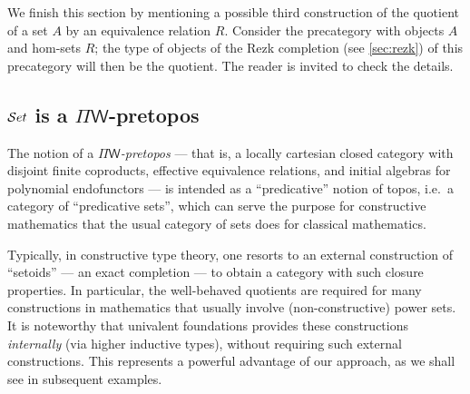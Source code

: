We finish this section by mentioning a possible third construction of the quotient of a set $A$ by an equivalence relation $R$.
Consider the precategory with objects $A$ and hom-sets $R$; the type of objects of the Rezk completion
%
(see \autoref{sec:rezk}) of this precategory will then be the
quotient. The reader is invited to check the details.

%
%
%

\subsection{\texorpdfstring{$\mathcal{S}et$}{Set} is a \texorpdfstring{$\Pi\mathsf{W}$}{ΠW}-pretopos}
\label{subsec:piw}

%

The notion of a \emph{$\Pi\mathsf{W}$-pretopos}
%
--- that is, a locally cartesian closed category
%
%
with disjoint finite coproducts, effective equivalence relations, and initial algebras for polynomial endofunctors --- is intended as a ``predicative''
%
notion of topos, i.e.\ a category of ``predicative sets'', which can serve the purpose for constructive mathematics
%
that the usual category of sets does for classical
%
mathematics.

Typically, in constructive type theory, one resorts to an external construction of ``setoids'' --- an exact completion --- to obtain a category with such closure properties.%
  In particular, the well-behaved quotients are required for many constructions in mathematics that usually involve (non-constructive) power sets.  It is noteworthy that univalent foundations provides these constructions \emph{internally} (via higher inductive types), without requiring such external constructions.  This represents a powerful advantage of our approach, as we shall see in subsequent examples.

